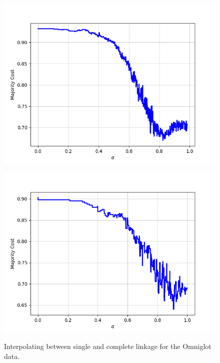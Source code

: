 \begin{figure}[H]
\begin{minipage}{.24\textwidth}
  {\includegraphics[width=\linewidth]{plots/omniglot-intra-sc/Tagalog}}
\end{minipage}
\begin{minipage}{.24\textwidth}
  \centering
  {\includegraphics[width=\linewidth]{plots/omniglot-intra-sc/Tifinagh}}
\end{minipage}
\caption{%
  Interpolating between single and complete linkage for the Omniglot data.}
\label{}
\end{figure}

